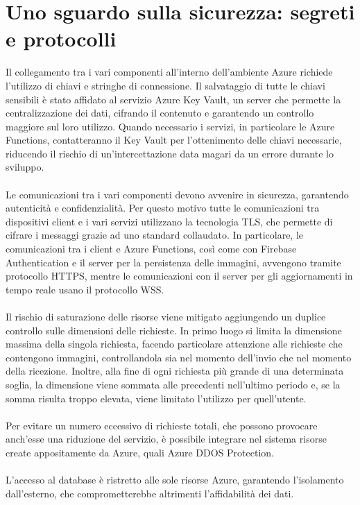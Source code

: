 \clearpage
\section{Uno sguardo sulla sicurezza: segreti e protocolli}

Il collegamento tra i vari componenti all’interno dell’ambiente Azure richiede l’utilizzo di chiavi e stringhe di connessione. 
Il salvataggio di tutte le chiavi sensibili è stato affidato al servizio Azure Key Vault,
 un server che permette la centralizzazione dei dati, cifrando il contenuto e garantendo un controllo maggiore sul loro utilizzo. 
Quando necessario i servizi, in particolare le Azure Functions, contatteranno il Key Vault per l’ottenimento delle chiavi necessarie, 
riducendo il rischio di un’intercettazione data magari da un errore durante lo sviluppo.\\
\\
Le comunicazioni tra i vari componenti devono avvenire in sicurezza, garantendo autenticità e confidenzialità. 
Per questo motivo tutte le comunicazioni tra dispositivi client e i vari servizi utilizzano la tecnologia TLS, che permette di cifrare i messaggi grazie ad uno standard collaudato. 
In particolare, le comunicazioni tra i client e Azure Functions, così come con Firebase Authentication e il server per la persistenza delle immagini, 
avvengono tramite protocollo HTTPS, mentre le comunicazioni con il server per gli aggiornamenti in tempo reale usano il protocollo WSS.\\
\\
Il rischio di saturazione delle risorse viene mitigato aggiungendo un duplice controllo sulle dimensioni delle richieste.
In primo luogo si limita la dimensione massima della singola richiesta, 
facendo particolare attenzione alle richieste che contengono immagini, 
controllandola sia nel momento dell'invio che nel momento della ricezione.
Inoltre, alla fine di ogni richiesta più grande di una determinata soglia,
la dimensione viene sommata alle precedenti nell'ultimo periodo e, 
se la somma risulta troppo elevata, viene limitato l'utilizzo per quell'utente.
\\
\\
Per evitare un numero eccessivo di richieste totali, 
che possono provocare anch'esse una riduzione del servizio, 
è possibile integrare nel sistema risorse create appositamente da Azure, 
quali Azure DDOS Protection.\\
\\
L’accesso al database è ristretto alle sole risorse Azure, garantendo l’isolamento dall’esterno, che comprometterebbe altrimenti l’affidabilità dei dati.\\

